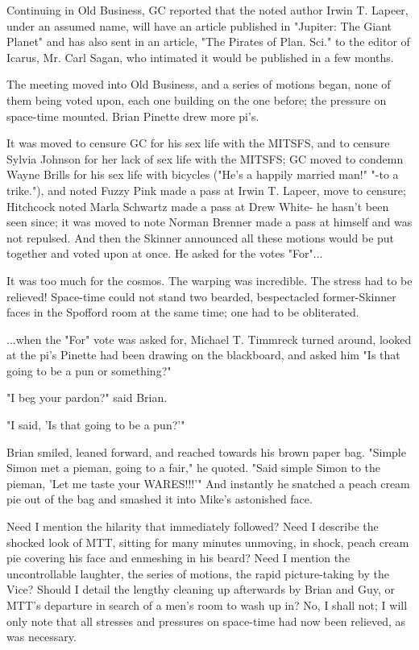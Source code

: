 \documentclass[12pt]{article}
\begin{document}
Continuing in Old Business, GC reported that the noted author Irwin T. Lapeer, under an assumed name, will have an article published in "Jupiter: The Giant Planet" and has also sent in an article, "The Pirates of Plan. Sci." to the editor of Icarus, Mr. Carl Sagan, who intimated it would be published in a few months.

The meeting moved into Old Business, and a series of motions began, none of them being voted upon, each one building on the one before; the pressure on space-time mounted. Brian Pinette drew more pi's.

It was moved to censure GC for his sex life with the MITSFS, and to censure Sylvia Johnson for her lack of sex life with the MITSFS; GC moved to condemn Wayne Brills for his sex life with bicycles ("He's a happily married man!" "-to a trike."), and noted Fuzzy Pink made a pass at Irwin T. Lapeer, move to censure; Hitchcock noted Marla Schwartz made a pass at Drew White- he hasn't been seen since; it was moved to note Norman Brenner made a pass at himself and was not repulsed. And then the Skinner announced all these motions would be put together and voted upon at once. He asked for the votes "For"...

It was too much for the cosmos. The warping was incredible. The stress had to be relieved! Space-time could not stand two bearded, bespectacled former-Skinner faces in the Spofford room at the same time; one had to be obliterated.

...when the "For" vote was asked for, Michael T. Timmreck turned around, looked at the pi's Pinette had been drawing on the blackboard, and asked him "Is that going to be a pun or something?"

"I beg your pardon?" said Brian.

"I said, 'Is that going to be a pun?'"

Brian smiled, leaned forward, and reached towards his brown paper bag. "Simple Simon met a pieman, going to a fair," he quoted. "Said simple Simon to the pieman, 'Let me taste your WARES!!!'" And instantly he snatched a peach cream pie out of the bag and smashed it into Mike's astonished face.

Need I mention the hilarity that immediately followed? Need I describe the shocked look of MTT, sitting for many minutes unmoving, in shock, peach cream pie covering his face and enmeshing in his beard? Need I mention the uncontrollable laughter, the series of motions, the rapid picture-taking by the Vice? Should I detail the lengthy cleaning up afterwards by Brian and Guy, or MTT's departure in search of a men's room to wash up in? No, I shall not; I will only note that all stresses and pressures on space-time had now been relieved, as was necessary.
\end{document}
